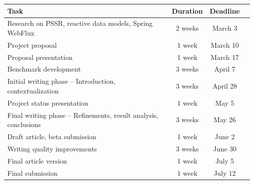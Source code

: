 \documentclass[a4paper,twoside,11pt]{article}
\begin{document}
\begin{table}[h]
  \centering
  \renewcommand{\arraystretch}{1.3}
  \begin{tabular}{|p{8cm}|c|c|p{6cm}|}
    \hline
    \textbf{Task}                                                   & \textbf{Duration} & \textbf{Deadline} \\
    \hline
    Research on PSSR, reactive data models, Spring WebFlux          & 2 weeks           & March 3           \\
    \hline
    Project proposal                                                & 1 week            & March 10          \\
    \hline
    Proposal presentation                                           & 1 week            & March 17          \\
    \hline
    Benchmark development                                           & 3 weeks           & April 7           \\
    \hline
    Initial writing phase – Introduction, contextualization         & 3 weeks           & April 28          \\
    \hline
    Project status presentation                                     & 1 week            & May 5             \\
    \hline
    Final writing phase – Refinements, result analysis, conclusions & 3 weeks           & May 26            \\
    \hline
    Draft article, beta submission                                  & 1 week            & June 2            \\
    \hline
    Writing quality improvements                                    & 3 weeks           & June 30           \\
    \hline
    Final article version                                           & 1 week            & July 5            \\
    \hline
    Final submission                                                & 1 week            & July 12           \\
    \hline
  \end{tabular}
  \label{tab:planning}
\end{table}



\end{document}
